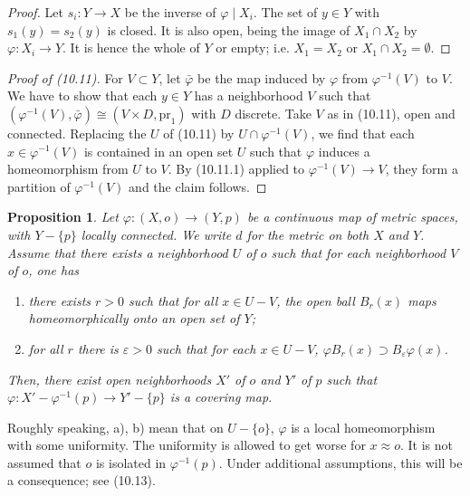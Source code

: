 \documentclass[12pt,a4paper]{article}
\theoremstyle{plain}
\newtheorem{proposition}[theorem]{Proposition}
\theoremstyle{definition}
\theoremstyle{remark}
\begin{document}
\begin{proof}
Let $s_i : Y \to X$ be the inverse of $\varphi \mid X_i$. The set of $y \in Y$ with $s_1(y) = s_2(y)$ is closed. It is also open, being the image of $X_1 \cap X_2$ by $\varphi : X_i \to Y$. It is hence the whole of $Y$ or empty; i.e. $X_1 = X_2$ or $X_1 \cap X_2 = \emptyset$.
\end{proof}

\begin{proof}[Proof of (10.11)]
For $V \subset Y$, let $\bar{\varphi}$ be the map induced by $\varphi$ from $\varphi^{-1}(V)$ to $V$. We have to show that each $y \in Y$ has a neighborhood $V$ such that $(\varphi^{-1}(V), \bar{\varphi}) \cong (V \times D, \text{pr}_1)$ with $D$ discrete. Take $V$ as in (10.11), open and connected. Replacing the $U$ of (10.11) by $U \cap \varphi^{-1}(V)$, we find that each $x \in \varphi^{-1}(V)$ is contained in an open set $U$ such that $\varphi$ induces a homeomorphism from $U$ to $V$. By (10.11.1) applied to $\varphi^{-1}(V) \to V$, they form a partition of $\varphi^{-1}(V)$ and the claim follows.
\end{proof}

\begin{proposition}
\label{10.12}
Let $\varphi : (X, o) \to (Y, p)$ be a continuous map of metric spaces, with $Y - \{p\}$ locally connected. We write $d$ for the metric on both $X$ and $Y$. Assume that there exists a neighborhood $U$ of $o$ such that for each neighborhood $V$ of $o$, one has
\begin{enumerate}
\item[a)] there exists $r > 0$ such that for all $x \in U - V$, the open ball $B_r(x)$ maps homeomorphically onto an open set of $Y$;
\item[b)] for all $r$ there is $\varepsilon > 0$ such that for each $x \in U - V$, $\varphi B_r(x) \supset B_\varepsilon \varphi(x)$.
\end{enumerate}
Then, there exist open neighborhoods $X'$ of $o$ and $Y'$ of $p$ such that $\varphi : X' - \varphi^{-1}(p) \to Y' - \{p\}$ is a covering map.
\end{proposition}

Roughly speaking, a), b) mean that on $U - \{o\}$, $\varphi$ is a local homeomorphism with some uniformity. The uniformity is allowed to get worse for $x \approx o$. It is not assumed that $o$ is isolated in $\varphi^{-1}(p)$. Under additional assumptions, this will be a consequence; see (10.13).
\end{document}
